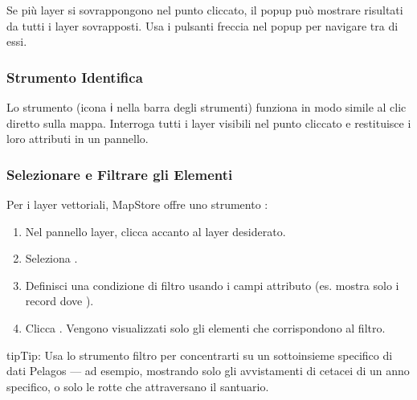 \documentclass[letterpaper,10pt,english]{sphinxmanual}
\begin{document}
\sphinxAtStartPar
Se più layer si sovrappongono nel punto cliccato, il pop\sphinxhyphen{}up può mostrare risultati
da tutti i layer sovrapposti. Usa i pulsanti freccia nel pop\sphinxhyphen{}up per navigare tra di essi.


\subsubsection{Strumento Identifica}
\label{\detokenize{it/04_esplorare_mappe:strumento-identifica}}
\sphinxAtStartPar
Lo strumento  (icona ℹ️ nella barra degli strumenti) funziona in modo
simile al clic diretto sulla mappa. Interroga tutti i layer visibili nel punto cliccato
e restituisce i loro attributi in un pannello.


\subsubsection{Selezionare e Filtrare gli Elementi}
\label{\detokenize{it/04_esplorare_mappe:selezionare-e-filtrare-gli-elementi}}
\sphinxAtStartPar
Per i layer vettoriali, MapStore offre uno strumento :
\begin{enumerate}
%
\item {} 
\sphinxAtStartPar
Nel pannello layer, clicca  accanto al layer desiderato.

\item {} 
\sphinxAtStartPar
Seleziona .

\item {} 
\sphinxAtStartPar
Definisci una condizione di filtro usando i campi attributo
(es. mostra solo i record dove ).

\item {} 
\sphinxAtStartPar
Clicca . Vengono visualizzati solo gli elementi che corrispondono al filtro.

\end{enumerate}

\begin{sphinxadmonition}{tip}{Tip:}
\sphinxAtStartPar
Usa lo strumento filtro per concentrarti su un sottoinsieme specifico di dati Pelagos —
ad esempio, mostrando solo gli avvistamenti di cetacei di un anno specifico, o solo le
rotte che attraversano il santuario.
\end{sphinxadmonition}
\end{document}
